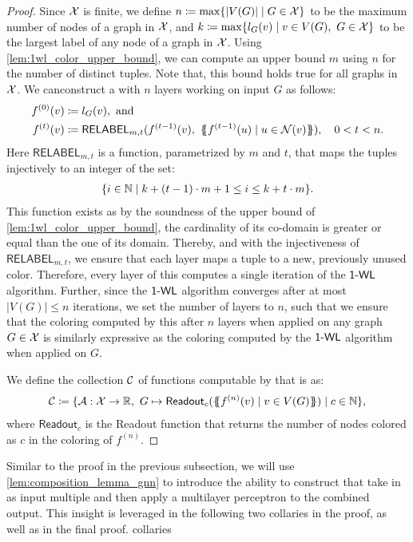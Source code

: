 \begin{proof}
Since $\mathcal{X}$ is finite, we define $n \coloneqq \max \{ |V(G)| \mid G \in \mathcal{X} \}$ to be the maximum number of nodes of a graph in $\mathcal{X}$, and $k \coloneqq \max \{ l_G(v) \mid v \in V(G),\ G \in \mathcal{X} \}$ to be the largest label of any node of a graph in $\mathcal{X}$. Using \cref{lem:1wl_color_upper_bound}, we can compute an upper bound $m$ using $n$ for the number of distinct tuples. Note that, this bound holds true for all graphs in $\mathcal{X}$. We canconstruct a \gnn with $n$ layers working on input $G$ as follows:
\begin{align*}
    f^{(0)}(v) &\coloneqq l_G(v), \ \text{and}\\
    f^{(t)}(v) &\coloneqq \textsf{RELABEL}_{m,t}(f^{(t-1)}(v), \ \MSopen f^{(t-1)}(u) \mid u \in \cN(v)\MSclose), \quad 0 < t < n.
\end{align*}
Here $\textsf{RELABEL}_{m,t}$ is a function, parametrized by $m$ and $t$, that maps the tuples injectively to an integer of the set:
\begin{align*}
    \{i \in \mathbb{N} \mid k + (t-1)\cdot m +1 \leq i \leq k + t \cdot m\}.
\end{align*}
This function exists as by the soundness of the upper bound of \cref{lem:1wl_color_upper_bound}, the cardinality of its co-domain is greater or equal than the one of its domain. Thereby, and with the injectiveness of $\textsf{RELABEL}_{m,t}$, we ensure that each \gnn layer maps a tuple to a new, previously unused color. Therefore, every layer of this \gnn computes a single iteration of the $\textsf{1-WL}$ algorithm. Further, since the $\textsf{1-WL}$ algorithm converges after at most $|V(G)| \leq n$ iterations, we set the number of layers to $n$, such that we ensure that the coloring computed by this \gnn after $n$ layers when applied on any graph $G \in \mathcal{X}$ is similarly expressive as the coloring computed by the $\textsf{1-WL}$ algorithm when applied on $G$.

We define the collection $\mathcal{C}$ of functions computable by \gnns that is \wldisc as: 
\begin{align*}
    \mathcal{C} \coloneqq \{ \mathcal{A}: \mathcal{X} \rightarrow \mathbb{R}, \ G \mapsto \textsf{Readout}_c(\{\!\!\{ f^{(n)}(v) \mid v \in V(G) \}\!\!\}) \mid c \in \mathbb{N} \},
\end{align*}
where $\textsf{Readout}_c$ is the \textsf{Readout} function that returns the number of nodes colored as $c$ in the coloring of $f^{(n)}$.
\end{proof}

Similar to the proof in the previous subsection, we will use \cref{lem:composition_lemma_gnn} to introduce the ability to construct \gnns that take in as input multiple \gnns and then apply a multilayer perceptron to the combined output. This insight is leveraged in the following two collaries in the proof, as well as in the final proof. collaries

